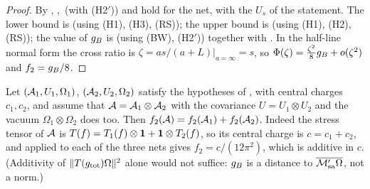 \begin{proof}
By , , \,(with (H2$'$)) and  hold for the net, with the $U_{s}$ of
the statement.  The lower bound is  (using (H1), (H3), (RS)); the upper bound is  (using
(H1), (H2), (RS)); the value of $g_{B}$ is  (using (BW), (H2$'$)) together with
.  In the half-line normal form the cross ratio is $\zeta=as/(a+L)|_{a=\infty}=s$, so
$\Phi(\zeta)=\frac{\zeta^{2}}{8}g_{B}+o(\zeta^{2})$ and $f_{2}=g_{B}/8$.
\end{proof}

\begin{corollary}[additivity]\label{cor:tensor}
Let $(\mathcal A_{1},U_{1},\Omega_{1})$, $(\mathcal A_{2},U_{2},\Omega_{2})$ satisfy the hypotheses of , with
central charges $c_{1},c_{2}$, and assume that $\mathcal A=\mathcal A_{1}\otimes\mathcal A_{2}$ with the covariance
$U=U_{1}\otimes U_{2}$ and the vacuum $\Omega_{1}\otimes\Omega_{2}$ does too.  Then $f_{2}(\mathcal A)=f_{2}(\mathcal A_{1})+f_{2}(\mathcal A_{2})$.  Indeed the stress
tensor of $\mathcal A$ is $T(f)=T_{1}(f)\otimes\mathbf 1+\mathbf 1\otimes T_{2}(f)$, so its central charge is $c=c_{1}+c_{2}$,
and  applied to each of the three nets gives $f_{2}=c/(12\pi^{2})$, which is additive in $c$.
(Additivity of $\|T(g_{\rm tot})\Omega\|^{2}$ alone would not suffice: $g_{B}$ is a distance to
$\overline{\mathcal M'_{\rm sa}\Omega}$, not a norm.)
\end{corollary}
